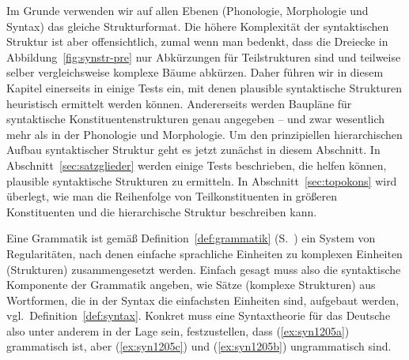 Im Grunde verwenden wir auf allen Ebenen (Phonologie, Morphologie und Syntax) das gleiche Strukturformat.
Die höhere Komplexität der syntaktischen Struktur ist aber offensichtlich, zumal wenn man bedenkt, dass die Dreiecke in Abbildung~\ref{fig:synstr-pre} nur Abkürzungen für Teilstrukturen sind und teilweise selber vergleichsweise komplexe Bäume abkürzen.
Daher führen wir in diesem Kapitel einerseits in einige Tests ein, mit denen plausible syntaktische Strukturen heuristisch ermittelt werden können.
Andererseits werden Baupläne für syntaktische Konstituentenstrukturen genau angegeben -- und zwar wesentlich mehr als in der Phonologie und Morphologie.
Um den prinzipiellen hierarchischen Aufbau syntaktischer Struktur geht es jetzt zunächst in diesem Abschnitt.
In Abschnitt~\ref{sec:satzglieder} werden einige Tests beschrieben, die helfen können, plausible syntaktische Strukturen zu ermitteln.
In Abschnitt~\ref{sec:topokons} wird überlegt, wie man die Reihenfolge von Teilkonstituenten in größeren Konstituenten und die hierarchische Struktur beschreiben kann.


Eine Grammatik ist gemäß Definition~\ref{def:grammatik} (S.~\pageref{def:grammatik}) ein System von Regularitäten, nach denen einfache sprachliche Einheiten zu komplexen Einheiten (Strukturen) zusammengesetzt werden.
Einfach gesagt muss also die syntaktische Komponente der Grammatik angeben, wie Sätze (komplexe Strukturen) aus Wortformen, die in der Syntax die einfachsten Einheiten sind, aufgebaut werden, vgl.\ Definition~\ref{def:syntax}.
Konkret muss eine Syntaxtheorie für das Deutsche also unter anderem in der Lage sein, festzustellen, dass (\ref{ex:syn1205a}) grammatisch ist, aber (\ref{ex:syn1205c}) und (\ref{ex:syn1205b}) ungrammatisch sind.


\begin{exe}
  \ex\label{ex:syn1205}
  \begin{xlist}
  \end{xlist}
\end{exe}

